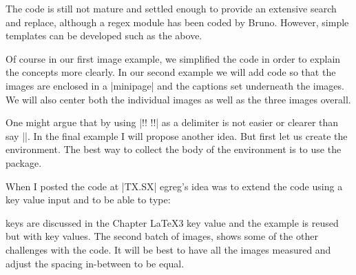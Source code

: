 The code is still not mature and settled enough to provide an extensive search and replace, although a regex module has been coded by Bruno. However, simple templates can be developed such as the above. 

Of course in our first image example, we simplified the code in order to explain the concepts more clearly. In our second example we will add code so that the images are enclosed in a |minipage| and the captions set underneath the images. We will also center both the individual images as well as the three images overall.


One might argue that by using |!!  !!| as a delimiter is not easier or clearer than say |\img |. In the final example I will propose another idea. But first let us create the environment. The best way to collect the body of the environment is to use the  package. 


When I posted the code at |TX.SX| egreg’s idea was to extend the code using a key value input and to be able to type:


 keys are discussed in the Chapter LaTeX3 key value and the example is reused but with key values. The second batch of images, shows some of the other challenges with the code. It will be best to have all the images measured and adjust the spacing in-between to be equal. 
\newpage


